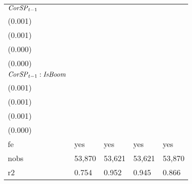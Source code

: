 \begin{tabular}{lllll}
${{\it CorSP}}_{t-1}$                       &    \makecell{$-0.002^{*}$ \\ (0.001)} &     \makecell{$-0.000^{}$ \\ (0.001)} &     \makecell{$-0.000^{}$ \\ (0.000)} &     \makecell{$-0.000^{}$ \\ (0.000)} \\
${{\it CorSP}}_{t-1} : {\it IsBoom}$        &    \makecell{$0.003^{**}$ \\ (0.001)} &     \makecell{$-0.001^{}$ \\ (0.001)} &     \makecell{$-0.000^{}$ \\ (0.001)} &   \makecell{$0.001^{***}$ \\ (0.000)} \\
\midrule fe                                 &                                   yes &                                   yes &                                   yes &                                   yes \\
nobs                                        &                                53,870 &                                53,621 &                                53,621 &                                53,870 \\
r2                                          &                                 0.754 &                                 0.952 &                                 0.945 &                                 0.866 \\
\bottomrule
\end{tabular}
